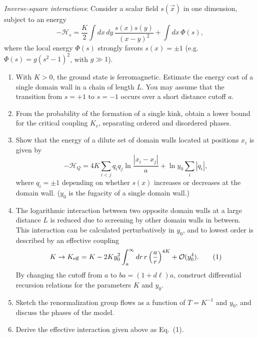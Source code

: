 \begin{problem}
    \textit{Inverse-square interactions}: Consider a scalar field $s(\vec{x})$ in one dimension, subject to an energy
    \[
        -\mathcal{H}_s = \frac{K}{2}\int dx\,dy\,\frac{s(x)s(y)}{(x-y)^2} + \int dx\,\Phi(s),
    \]
    where the local energy $\Phi(s)$ strongly favors $s(x) = \pm 1$ (e.g.\ $\Phi(s) = g(s^2-1)^2$, with $g \gg 1$).

    \begin{enumerate}
        \item[(a)] With $K > 0$, the ground state is ferromagnetic. Estimate the energy cost of a single domain wall in a chain of length $L$. You may assume that the transition from $s = +1$ to $s = -1$ occurs over a short distance cutoff $a$.

        \item[(b)] From the probability of the formation of a single kink, obtain a lower bound for the critical coupling $K_c$, separating ordered and disordered phases.

        \item[(c)] Show that the energy of a dilute set of domain walls located at positions $x_i$ is given by
        \[
            -\mathcal{H}_Q = 4K\sum_{i < j}q_i q_j\ln\frac{|x_i - x_j|}{a} + \ln y_0\sum_i|q_i|,
        \]
        where $q_i = \pm 1$ depending on whether $s(x)$ increases or decreases at the domain wall. ($y_0$ is the fugacity of a single domain wall.)

        \item[(d)] The logarithmic interaction between two opposite domain walls at a large distance $L$ is reduced due to screening by other domain walls in between. This interaction can be calculated perturbatively in $y_0$, and to lowest order is described by an effective coupling
        \[
            K \to K_{\rm eff} = K - 2Ky_0^2\int_a^\infty dr\,r\left(\frac{a}{r}\right)^{4K} + \mathcal{O}(y_0^4). \tag{1}
        \]
        By changing the cutoff from $a$ to $ba = (1 + d\ell)a$, construct differential recursion relations for the parameters $K$ and $y_0$.

        \item[(e)] Sketch the renormalization group flows as a function of $T = K^{-1}$ and $y_0$, and discuss the phases of the model.

        \item[(f)] Derive the effective interaction given above as Eq.~(1).
    \end{enumerate}
\end{problem}

